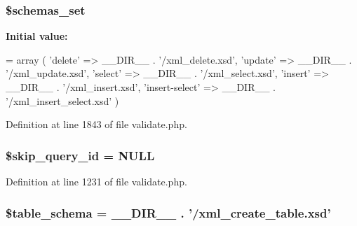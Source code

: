 \hypertarget{validate_8php_afdc62b6a8a4984ca9a53a1431233ed9a}{
\subsubsection[{\$schemas\+\_\+set}]{\setlength{\rightskip}{0pt plus 5cm}\$schemas\+\_\+set}}\label{validate_8php_afdc62b6a8a4984ca9a53a1431233ed9a}
{\bfseries Initial value\+:}
\begin{DoxyCode}
=
        array
            (
                \textcolor{stringliteral}{'delete'} => \_\_DIR\_\_ . \textcolor{stringliteral}{'/xml\_delete.xsd'},
                \textcolor{stringliteral}{'update'} => \_\_DIR\_\_ . \textcolor{stringliteral}{'/xml\_update.xsd'},
                \textcolor{stringliteral}{'select'} => \_\_DIR\_\_ . \textcolor{stringliteral}{'/xml\_select.xsd'},
                \textcolor{stringliteral}{'insert'} => \_\_DIR\_\_ . \textcolor{stringliteral}{'/xml\_insert.xsd'},
                \textcolor{stringliteral}{'insert-select'} => \_\_DIR\_\_ . \textcolor{stringliteral}{'/xml\_insert\_select.xsd'}
            )
\end{DoxyCode}


Definition at line 1843 of file validate.\+php.

\hypertarget{validate_8php_a33587a1c0ee8a26e80e32ffac472df40}{
\subsubsection[{\$skip\+\_\+query\+\_\+id}]{\setlength{\rightskip}{0pt plus 5cm}\$skip\+\_\+query\+\_\+id = N\+U\+L\+L}}\label{validate_8php_a33587a1c0ee8a26e80e32ffac472df40}


Definition at line 1231 of file validate.\+php.

\hypertarget{validate_8php_ab7d4a5db53db0f967ab81c779a5b0ccb}{
\subsubsection[{\$table\+\_\+schema}]{\setlength{\rightskip}{0pt plus 5cm}\$table\+\_\+schema = \+\_\+\+\_\+\+D\+I\+R\+\_\+\+\_\+ . '/xml\+\_\+create\+\_\+table.\+xsd'}}\label{validate_8php_ab7d4a5db53db0f967ab81c779a5b0ccb}


